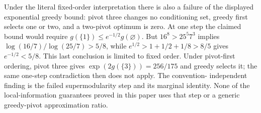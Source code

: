 Under the literal fixed-order interpretation there is also a failure of
the displayed exponential greedy bound: pivot three changes no conditioning
set, greedy first selects one or two, and a two-pivot optimum is zero.
At one step the claimed bound would require
$g(\{1\})\le e^{-1/2}g(\varnothing)$.
But $16^8>25^5 7^3$ implies
$\log(16/7)/\log(25/7)>5/8$, while
$e^{1/2}>1+1/2+1/8>8/5$ gives $e^{-1/2}<5/8$.
This last conclusion is limited to fixed order. Under pivot-first
ordering, pivot three gives $\exp(2g(\{3\}))=256/175$ and greedy selects
it; the same one-step contradiction then does not apply. The convention-
independent finding is the failed supermodularity step and its marginal
identity. None of the local-information guarantees proved in this paper
uses that step or a generic greedy-pivot approximation ratio.
